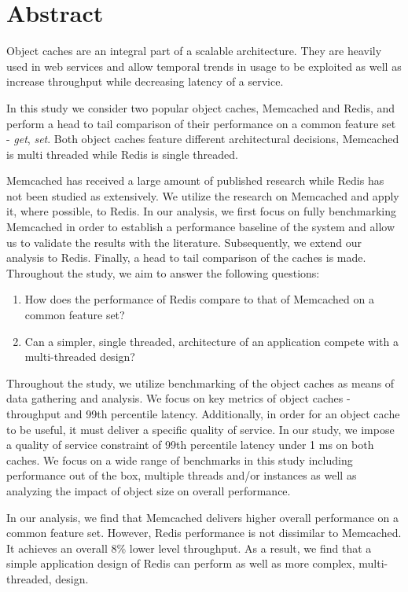 \section{Abstract}
Object caches are an integral part of a scalable architecture. They are heavily used in web services and allow temporal trends in usage to be exploited as well as increase throughput while decreasing latency of a service.

In this study we consider two popular object caches, Memcached and Redis, and perform a head to tail comparison of their performance on a common feature set - \textit{get}, \textit{set}. Both object caches feature different architectural decisions, Memcached is multi threaded while Redis is single threaded.

Memcached has received a large amount of published research while Redis has not been studied as extensively. We utilize the research on Memcached and apply it, where possible, to Redis. In our analysis, we first focus on fully benchmarking Memcached in order to establish a performance baseline of the system and allow us to validate the results with the literature. Subsequently, we extend our analysis to Redis. Finally, a head to tail comparison of the caches is made. Throughout the study, we aim to answer the following questions:

\begin{enumerate}
  \item How does the performance of Redis compare to that of Memcached on a common feature set?
  \item Can a simpler, single threaded, architecture of an application compete with a multi-threaded design?
\end{enumerate}

Throughout the study, we utilize benchmarking of the object caches as means of data gathering and analysis. We focus on key metrics of object caches - throughput and 99th percentile latency. Additionally, in order for an object cache to be useful, it must deliver a specific quality of service. In our study, we impose a quality of service constraint of 99th percentile latency under 1 ms on both caches. We focus on a wide range of benchmarks in this study including performance out of the box, multiple threads and/or instances as well as analyzing the impact of object size on overall performance.

In our analysis, we find that Memcached delivers higher overall performance on a common feature set. However, Redis performance is not dissimilar to Memcached. It achieves an overall 8\% lower level throughput. As a result, we find that a simple application design of Redis can perform as well as more complex, multi-threaded, design.

